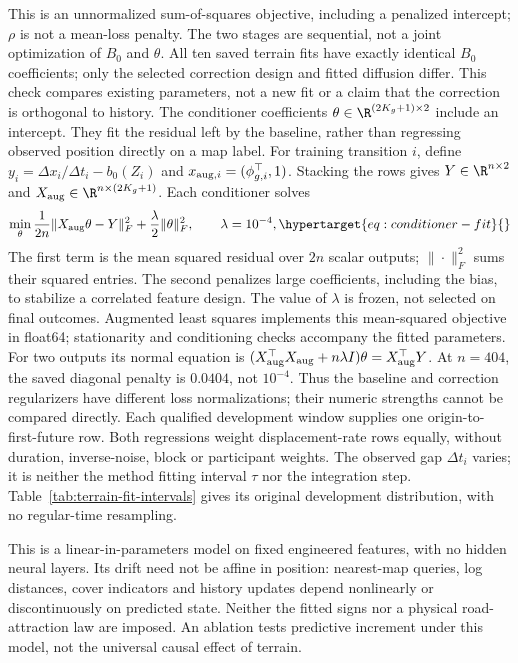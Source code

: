 This is an unnormalized sum-of-squares objective, including a penalized
intercept; \(\rho\) is not a mean-loss penalty. The two stages are sequential,
not a joint optimization of \(B_0\) and \(\theta\). All ten saved terrain fits
have exactly identical \(B_0\) coefficients; only the selected correction
design and fitted diffusion differ. This check compares existing parameters,
not a new fit or a claim that the correction is orthogonal to history.
The conditioner coefficients \(\theta\in\R^{(2K_g+1)\times2}\)
include an intercept. They fit the residual left by the baseline, rather than
regressing observed position directly on a map label.
For training transition \(i\), define
\(y_i=\Delta x_i/\Delta t_i-b_0(Z_i)\) and
\(x_{{\rm aug},i}=(\phi_{g,i}^\top,1)\).
Stacking the rows gives \(Y\in\R^{n\times2}\) and
\(X_{\rm aug}\in\R^{n\times(2K_g+1)}\).
Each conditioner solves
\begin{equation}
 \min_\theta\frac{1}{2n}\|X_{\rm aug}\theta-Y\|_F^2
       +\frac{\lambda}{2}\|\theta\|_F^2,\qquad\lambda=10^{-4},
 \label{eq:conditioner-fit}\hypertarget{eq:conditioner-fit}{}
\end{equation}
The first term is the mean squared residual over \(2n\) scalar outputs;
\(\|\cdot\|_F^2\) sums their squared entries. The second penalizes large
coefficients, including the bias, to stabilize a correlated feature design.
The value of \(\lambda\) is frozen, not selected on final outcomes.
Augmented least squares implements this mean-squared objective in float64;
stationarity and conditioning checks accompany the fitted parameters.
For two outputs its normal equation is
\((X_{\rm aug}^\top X_{\rm aug}+n\lambda I)\theta=X_{\rm aug}^\top Y\).
At \(n=404\), the saved diagonal penalty is \(0.0404\), not \(10^{-4}\).
Thus the baseline and correction regularizers have different loss
normalizations; their numeric strengths cannot be compared directly.
Each qualified development window supplies one origin-to-first-future row.
Both regressions weight displacement-rate rows equally, without duration,
inverse-noise, block or participant weights. The observed gap
\(\Delta t_i\) varies; it is neither the method fitting interval \(\tau\)
nor the integration step. Table~\ref{tab:terrain-fit-intervals} gives its
original development distribution, with no regular-time resampling.

This is a linear-in-parameters model on fixed engineered features, with no
hidden neural layers. Its drift need not be affine in position: nearest-map
queries, log distances, cover indicators and history updates depend
nonlinearly or discontinuously on predicted state. Neither the fitted signs
nor a physical road-attraction law are imposed. An ablation tests predictive
increment under this model, not the universal causal effect of terrain.

